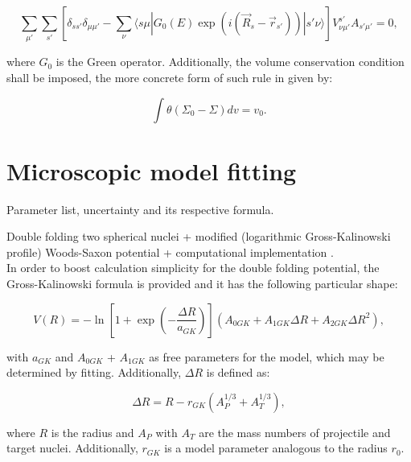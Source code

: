 \documentclass[openany]{book}
\begin{document}
\begin{equation}\label{potentialNumerical_TCSM_algebraicEquation}
\sum_{\mu'} \sum_{s'} \left[\delta_{ss'}\delta_{\mu\mu'} - \sum_{\nu} { \langle s\mu | G_0(E) \exp{(i(\vec R_s - \vec r_{s'}))} | s'\nu \rangle } \right] V^{s'}_{\nu \mu'}A_{s'\mu'} = 0 ,
\end{equation}

where $G_0$ is the Green operator. Additionally, the volume conservation condition shall be imposed, the more concrete form of such rule in given by: 
 
 \begin{equation}\label{potentialNumerical_TCSM_volumeConservation}
	\int\theta(\Sigma_0 - \Sigma) dv = v_0.
 \end{equation}



\section{Microscopic model fitting} \label{sec:microscopicFitting}

Parameter list, uncertainty and its respective formula.

Double folding two spherical nuclei + modified (logarithmic Gross-Kalinowski profile) Woods-Saxon potential + computational implementation \cite{gontchar_chushnyakova_2016}. \\

In order to boost calculation simplicity for the double folding potential, the Gross-Kalinowski formula is provided and it has the following particular shape: 

\begin{equation}\label{numericalPotential_doubleFolding_approximation}
	V(R) = - \ln {\left[1 + \exp {\left(-\frac{\Delta R}{a_{GK}}\right)} \right]} (A_{0GK} + A_{1GK} \Delta R + A_{2GK} \Delta R^2),
\end{equation}

with $a_{GK}$ and $A_{0GK}$ + $A_{1GK}$ as free parameters for the model, which may be determined by fitting. Additionally, $\Delta R$ is defined as: 

\begin{equation}\label{numericalPotential_doubleFolding_approximation_DeltaR}
	\Delta R = R - r_{GK} (A^{1/3}_P + A^{1/3}_T),  
\end{equation}

where $R$ is the radius and $A_P$ with $A_T$ are the mass numbers of projectile and target nuclei. Additionally, $r_{GK}$ is a model parameter analogous to the radius $r_0$. 
\end{document}

